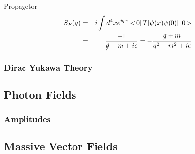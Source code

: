 \documentclass{jarticle}
\newcommand{\bra}[0]{<\!}
\newcommand{\braend}[0]{|\,}
\newcommand{\ketend}[0]{\,|}
\newcommand{\ket}[0]{\!>}
\newcommand{\myqftsrcdirectory}[0]{./}
\newcommand{\mainqftsrcdirectory}[0]{../../../src_qft}
\begin{document}
Propagetor
\begin{eqnarray}
S_F(q) &=& i \int d^4x e^{iqx}
\bra 0 \braend T[\psi(x) \bar{\psi}(0)]
\ketend 0 \ket
\nonumber\\
&=&
\frac{-1}{\slashed{q} - m + i \epsilon}
=
- \frac{\slashed{q} + m}{ q^2 - m^2 + i \epsilon}
\end{eqnarray}

\subsubsection{Dirac Yukawa Theory}
\label{sec:DiracYukawa}




\begin{comment}
\subsubsection{Majorana Field}
Massless, spin1/2, selfconjugate.
\begin{equation}
i \slashed{\partial} \psi(x) = 0\,,
\hspace{3mm}
\bar{\psi}(x) i \stackrel{\leftarrow}{\slashed{\partial}}   = 0
\end{equation}
\end{comment}

\newpage
\subsection{Photon Fields}


\subsubsection{Amplitudes}



\newpage
\subsection{Massive Vector  Fields}


\newpage
\end{document}

